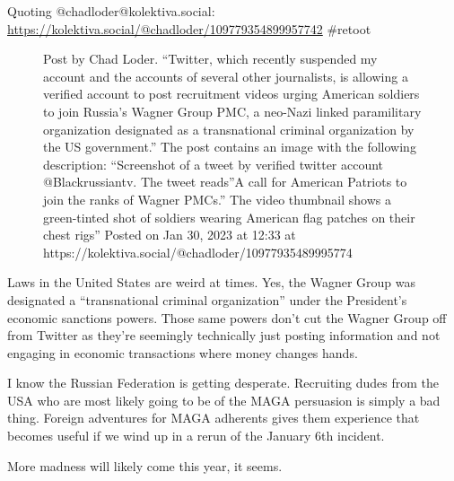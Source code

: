 Quoting @chadloder@kolektiva.social:
\url{https://kolektiva.social/@chadloder/109779354899957742} \#retoot

\begin{figure}
\centering
{}
\caption{Post by Chad Loder. ``Twitter, which recently suspended my
account and the accounts of several other journalists, is allowing a
verified account to post recruitment videos urging American soldiers to
join Russia's Wagner Group PMC, a neo-Nazi linked paramilitary
organization designated as a transnational criminal organization by the
US government.'' The post contains an image with the following
description: ``Screenshot of a tweet by verified twitter account
@Blackrussiantv. The tweet reads''A call for American Patriots to join
the ranks of Wagner PMCs.'' The video thumbnail shows a green-tinted
shot of soldiers wearing American flag patches on their chest rigs''
Posted on Jan 30, 2023 at 12:33 at
https://kolektiva.social/@chadloder/10977935489995774}
\end{figure}

Laws in the United States are weird at times. Yes, the Wagner Group was
designated a ``transnational criminal organization'' under the
President's economic sanctions powers. Those same powers don't cut the
Wagner Group off from Twitter as they're seemingly technically just
posting information and not engaging in economic transactions where
money changes hands.

I know the Russian Federation is getting desperate. Recruiting dudes
from the USA who are most likely going to be of the MAGA persuasion is
simply a bad thing. Foreign adventures for MAGA adherents gives them
experience that becomes useful if we wind up in a rerun of the January
6th incident.

More madness will likely come this year, it seems.
